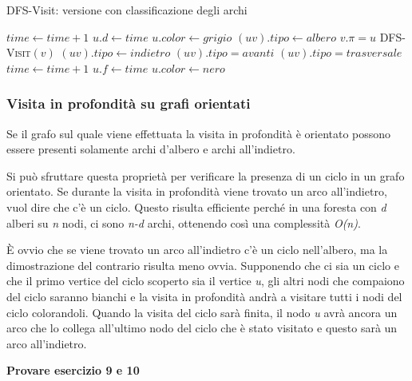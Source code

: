\begin{breakablealgorithm}
	\caption{DFS-Visit: versione con classificazione degli archi}
	\begin{algorithmic}[1]
			\State $ time \gets time + 1 $
			\State $ u.d \gets time $
			\State $ u.color \gets grigio $
					\State $(uv).tipo \gets albero$ 
					\State $ v.\pi = u $
					\State \textsc{DFS-Visit}$ (v) $  
				\EndIf
					\State $(uv).tipo \gets indietro$ 
				\EndIf
						\State $ (uv).tipo = avanti  $ 
					\EndIf
					\State $ (uv).tipo = trasversale  $  
					\EndIf
				\EndIf
			\EndFor
			\State $ time \gets time + 1 $
			\State $ u.f \gets time $
			\State $ u.color \gets nero $
		\EndFunction
	\end{algorithmic}
\end{breakablealgorithm}

\subsubsection{Visita in profondità su grafi orientati}\label{visita-in-profondituxe0-su-grafi-orientati}

Se il grafo sul quale viene effettuata la visita in profondità è
orientato possono essere presenti solamente archi d'albero e archi
all'indietro.


Si può sfruttare questa proprietà per verificare la presenza di un ciclo
in un grafo orientato. Se durante la visita in profondità viene trovato
un arco all'indietro, vuol dire che c'è un ciclo. Questo risulta
efficiente perché in una foresta con \emph{d} alberi su \emph{n} nodi,
ci sono \emph{n-d} archi, ottenendo così una complessità \emph{O(n)}.

È ovvio che se viene trovato un arco all'indietro c'è un ciclo
nell'albero, ma la dimostrazione del contrario risulta meno ovvia.
Supponendo che ci sia un ciclo e che il primo vertice del ciclo scoperto
sia il vertice \emph{u}, gli altri nodi che compaiono del ciclo saranno bianchi e la visita in profondità andrà a visitare tutti i nodi
del ciclo colorandoli. Quando la visita del ciclo sarà finita, il nodo
\emph{u} avrà ancora un arco che lo collega all'ultimo nodo del ciclo
che è stato visitato e questo sarà un arco all'indietro.


\textbf{Provare esercizio 9 e 10}
